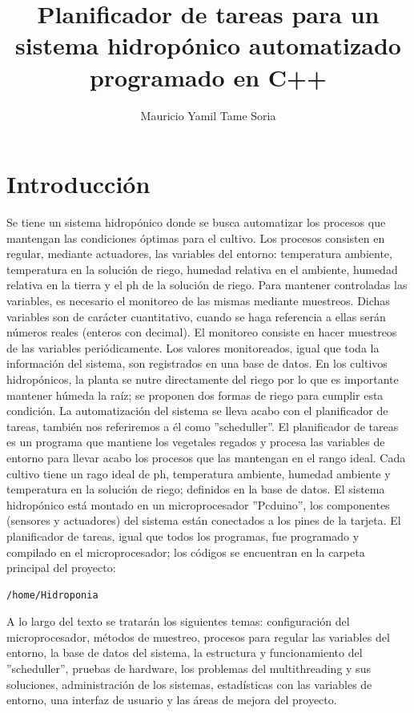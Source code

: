 \documentclass[10pt,twocolumn]{article}
\title{Planificador de tareas para un sistema hidrop\'onico automatizado programado en C++}
\author{Mauricio Yamil Tame Soria}
\begin{document}
\maketitle
\tableofcontents
\newpage

\section{Introducci\'on}
Se tiene un sistema hidrop\'onico donde se busca automatizar los procesos que mantengan las condiciones \'optimas para el cultivo. Los procesos consisten en regular, 
mediante actuadores, las 
variables del entorno: temperatura ambiente, temperatura en la soluci\'on de riego, humedad relativa en el ambiente, humedad relativa en la tierra y el ph de la soluci\'on 
de riego. Para mantener controladas las variables, es necesario el monitoreo de las mismas mediante muestreos. Dichas variables son de car\'acter 
cuantitativo, cuando se 
haga referencia a ellas ser\'an n\'umeros 
reales (enteros con decimal). El monitoreo consiste en hacer muestreos de las variables peri\'odicamente. Los valores 
monitoreados, igual que toda la informaci\'on del sistema, son registrados en una base de datos. En los cultivos hidrop\'onicos, la planta se nutre directamente del 
riego por lo que es importante mantener h\'umeda la ra\'iz; se proponen dos formas de riego para cumplir esta condici\'on. La automatizaci\'on del sistema se lleva acabo 
con el planificador de tareas, 
tambi\'en nos referiremos a \'el como ''scheduller''. El planificador de tareas es un programa que mantiene los vegetales regados y procesa las variables de entorno para 
llevar acabo los procesos que 
las mantengan en el rango ideal. Cada cultivo tiene un rago ideal de ph, temperatura ambiente, humedad ambiente y temperatura en la soluci\'on de riego; definidos 
en la 
base de datos. El sistema hidrop\'onico est\'a montado en un microprocesador ''Pcduino'', los componentes (sensores y actuadores) del sistema est\'an 
conectados a los pines de la tarjeta. El planificador de tareas, igual que todos los programas, fue programado y compilado en el microprocesador; los c\'odigos se 
encuentran en la carpeta principal del proyecto:

\begin{verbatim}
/home/Hidroponia
\end{verbatim}

A lo largo del 
texto se tratar\'an los siguientes temas: configuraci\'on del microprocesador, m\'etodos de muestreo, procesos para regular las variables del entorno, la base de datos 
del sistema, la estructura y 
funcionamiento del 
''scheduller'', pruebas de hardware, los problemas del multithreading y sus soluciones, administraci\'on de los sistemas, estad\'isticas con las variables de entorno, una 
interfaz de usuario y las \'areas de mejora del proyecto.
\end{document}
